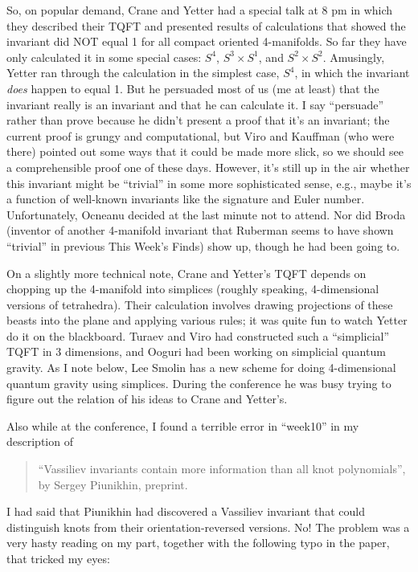 \documentclass{article}
\begin{document}
So, on popular demand, Crane and Yetter had a special talk at 8 pm in
which they described their TQFT and presented results of calculations
that showed the invariant did NOT equal 1 for all compact oriented
4-manifolds. So far they have only calculated it in some special cases:
\(S^4\), \(S^3 \times S^1\), and \(S^2 \times S^2\). Amusingly, Yetter
ran through the calculation in the simplest case, \(S^4\), in which the
invariant \emph{does} happen to equal 1. But he persuaded most of us (me
at least) that the invariant really is an invariant and that he can
calculate it. I say ``persuade'' rather than prove because he didn't
present a proof that it's an invariant; the current proof is grungy and
computational, but Viro and Kauffman (who were there) pointed out some
ways that it could be made more slick, so we should see a comprehensible
proof one of these days. However, it's still up in the air whether this
invariant might be ``trivial'' in some more sophisticated sense, e.g.,
maybe it's a function of well-known invariants like the signature and
Euler number. Unfortunately, Ocneanu decided at the last minute not to
attend. Nor did Broda (inventor of another 4-manifold invariant that
Ruberman seems to have shown ``trivial'' in previous This Week's Finds)
show up, though he had been going to.

On a slightly more technical note, Crane and Yetter's TQFT depends on
chopping up the 4-manifold into simplices (roughly speaking,
4-dimensional versions of tetrahedra). Their calculation involves
drawing projections of these beasts into the plane and applying various
rules; it was quite fun to watch Yetter do it on the blackboard. Turaev
and Viro had constructed such a ``simplicial'' TQFT in 3 dimensions, and
Ooguri had been working on simplicial quantum gravity. As I note below,
Lee Smolin has a new scheme for doing 4-dimensional quantum gravity
using simplices. During the conference he was busy trying to figure out
the relation of his ideas to Crane and Yetter's.

Also while at the conference, I found a terrible error in ``week10'' in
my description of

\begin{quote}
``Vassiliev invariants contain more information than all knot
polynomials'', by Sergey Piunikhin, preprint.
\end{quote}

I had said that Piunikhin had discovered a Vassiliev invariant that
could distinguish knots from their orientation-reversed versions. No!
The problem was a very hasty reading on my part, together with the
following typo in the paper, that tricked my eyes:
\end{document}
